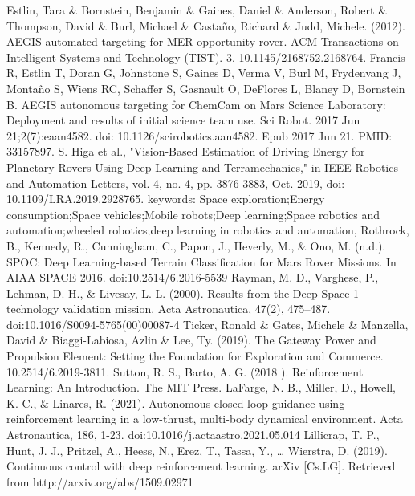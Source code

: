 \documentclass[conference]{IEEEtran}
\begin{document}
\begin{thebibliography}{00}
 Estlin, Tara \& Bornstein, Benjamin \& Gaines, Daniel \& Anderson, Robert \& Thompson, David \& Burl, Michael \& Castaño, Richard \& Judd, Michele. (2012). AEGIS automated targeting for MER opportunity rover. ACM Transactions on Intelligent Systems and Technology (TIST). 3. 10.1145/2168752.2168764.
 Francis R, Estlin T, Doran G, Johnstone S, Gaines D, Verma V, Burl M, Frydenvang J, Montaño S, Wiens RC, Schaffer S, Gasnault O, DeFlores L, Blaney D, Bornstein B. AEGIS autonomous targeting for ChemCam on Mars Science Laboratory: Deployment and results of initial science team use. Sci Robot. 2017 Jun 21;2(7):eaan4582. doi: 10.1126/scirobotics.aan4582. Epub 2017 Jun 21. PMID: 33157897.
 S. Higa et al., "Vision-Based Estimation of Driving Energy for Planetary Rovers Using Deep Learning and Terramechanics," in IEEE Robotics and Automation Letters, vol. 4, no. 4, pp. 3876-3883, Oct. 2019, doi: 10.1109/LRA.2019.2928765.
keywords: {Space exploration;Energy consumption;Space vehicles;Mobile robots;Deep learning;Space robotics and automation;wheeled robotics;deep learning in robotics and automation},
 Rothrock, B., Kennedy, R., Cunningham, C., Papon, J., Heverly, M., \& Ono, M. (n.d.). SPOC: Deep Learning-based Terrain Classification for Mars Rover Missions. In AIAA SPACE 2016. doi:10.2514/6.2016-5539
 Rayman, M. D., Varghese, P., Lehman, D. H., \& Livesay, L. L. (2000). Results from the Deep Space 1 technology validation mission. Acta Astronautica, 47(2), 475–487. doi:10.1016/S0094-5765(00)00087-4
 Ticker, Ronald \& Gates, Michele \& Manzella, David \& Biaggi-Labiosa, Azlin \& Lee, Ty. (2019). The Gateway Power and Propulsion Element: Setting the Foundation for Exploration and Commerce. 10.2514/6.2019-3811.
 Sutton, R. S., Barto, A. G. (2018 ). Reinforcement Learning: An Introduction. The MIT Press.
 LaFarge, N. B., Miller, D., Howell, K. C., \& Linares, R. (2021). Autonomous closed-loop guidance using reinforcement learning in a low-thrust, multi-body dynamical environment. Acta Astronautica, 186, 1-23. doi:10.1016/j.actaastro.2021.05.014
 Lillicrap, T. P., Hunt, J. J., Pritzel, A., Heess, N., Erez, T., Tassa, Y., … Wierstra, D. (2019). Continuous control with deep reinforcement learning. arXiv [Cs.LG]. Retrieved from http://arxiv.org/abs/1509.02971
\end{thebibliography}

\end{document}
